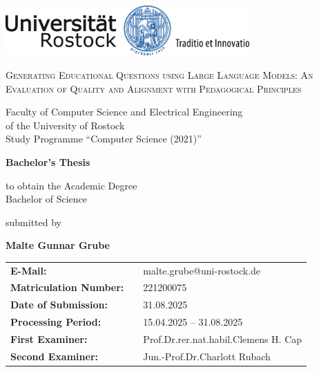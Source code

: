 \documentclass[a4paper,12pt]{scrreprt}
\def\theauthor{Malte Gunnar Grube}
\def\thetitle{Generating Educational Questions using Large
Language Models: An Evaluation of Quality and
Alignment with Pedagogical Principles}
\begin{document}
\begin{titlepage}
    \centering
    \vspace*{\fill}
    \includegraphics[width=0.7\textwidth]{img/logo.jpg}

    \vspace{4em}
    {\LARGE\textsc{\thetitle}\par}

    \vspace{2em}
    {
        \large 
        Faculty of Computer Science and Electrical Engineering \\
        of the University of Rostock                           \\
        Study Programme \enquote{Computer Science (2021)}      \\
    }

    \vspace{2.5em}
    {\Large\textbf{Bachelor's Thesis}\par}

    \vspace{1em}
    to obtain the Academic Degree \\
    Bachelor of Science\par

    \vspace{1.5em}
    submitted by\par
    \vspace{1em}
    {\large\textbf{\theauthor}\par}
    \vspace*{5em}

    \vspace*{\fill}
    \begin{center}
        \begin{tabular}{lll}
            \textbf{E-Mail:}               & & malte.grube@uni-rostock.de                              	     \\
            \textbf{Matriculation Number:} & & 221200075                                                     \\
            \textbf{Date of Submission:}   & & 31.08.2025                                                    \\
            \textbf{Processing Period:}    & & 15.04.2025 -- 31.08.2025                                      \\
            \textbf{First Examiner:}       & & Prof.\;Dr.\;rer.nat.habil.\;Clemens H. Cap                    \\
            \textbf{Second Examiner:}      & & Jun.-Prof.\;Dr.\;Charlott Rubach                              \\
        \end{tabular}
    \end{center}
\end{titlepage}
\end{document}
